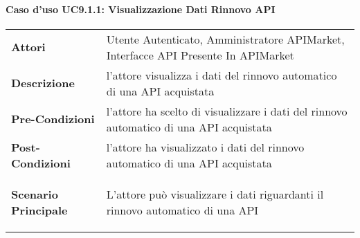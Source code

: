 \paragraph{Caso d'uso UC9.1.1: Visualizzazione Dati Rinnovo API}
\label{UC9.1.1}

\renewcommand*{\arraystretch}{1.6}
\begin{longtable}{ l | p{11cm}}
	\hline
	\rowcolor{Gray}
	\multicolumn{2}{c}{UC9.1.1: Visualizzazione Dati Rinnovo API} \\
	\hline
	\textbf{Attori} &Utente Autenticato, Amministratore APIMarket, Interfacce API Presente In APIMarket \\
	\textbf{Descrizione} & l'attore visualizza i dati del rinnovo automatico di una API acquistata \\
	\textbf{Pre-Condizioni} &  l'attore ha scelto di visualizzare i dati del rinnovo automatico di una API acquistata\\
	\textbf{Post-Condizioni}& l'attore ha visualizzato i dati del rinnovo automatico di una API acquistata\\
	\textbf{Scenario Principale} & \begin{enumerate*}[label=(\arabic*.),itemjoin={\newline}]
		\item L'attore può visualizzare i dati riguardanti il rinnovo automatico di una API
	\end{enumerate*}\\
\end{longtable}
